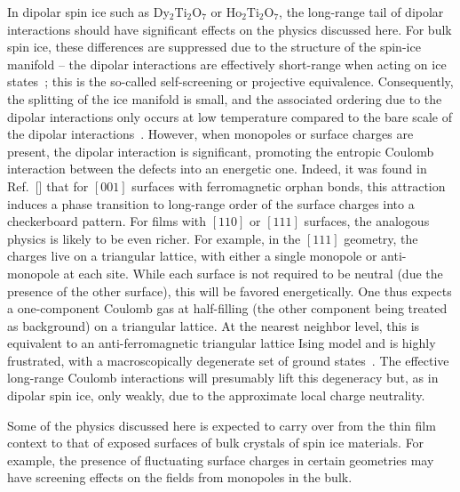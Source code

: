 \documentclass[aps,prx,reprint,runinaddress,superscriptaddress,amsmath,amssymb,floatfix,longbibliography]{revtex4-1}
\newcommand{\abo}[2]{{#1}$_2${#2}$_2$O$_7$}
\begin{document}
In dipolar spin ice such as \abo{Dy}{Ti} or \abo{Ho}{Ti}, the long-range tail of dipolar interactions should have significant effects on the physics discussed here. For bulk spin ice, these differences are suppressed due to the structure of the spin-ice manifold -- the dipolar interactions are effectively short-range when acting on ice states~\cite{Gingras2001CJP,Isakov2005}; this is the so-called self-screening or projective equivalence. Consequently, the splitting of the ice manifold is small, and the associated ordering due to the dipolar interactions only occurs at low temperature compared to the bare scale of the dipolar interactions~\cite{Melko2001}. However, when monopoles or surface charges are present, the dipolar interaction is significant, promoting the entropic Coulomb interaction between the defects into an energetic one. Indeed, it was found in  Ref.~[] that for $[001]$ surfaces with ferromagnetic orphan bonds, this attraction induces a phase transition to long-range order of the surface charges into a checkerboard pattern. For films with $[110]$ or $[111]$ surfaces, the analogous physics is likely to be even richer. For example, in the $[111]$ geometry, the charges live on a triangular lattice, with either a single monopole or anti-monopole at each site. While each surface is not required to be neutral (due the presence of the other surface), this will be favored energetically. One thus expects a one-component Coulomb gas at half-filling (the other component being treated as background) on a triangular lattice. At the nearest neighbor level, this is equivalent to an anti-ferromagnetic triangular lattice Ising model and is highly frustrated, with a macroscopically degenerate set of ground states~\cite{Wannier1950}. The effective long-range Coulomb interactions will presumably lift this degeneracy but, as in dipolar spin ice, only weakly, due to the approximate local charge neutrality. 

Some of the physics discussed here is expected to carry over from the thin film context to that of exposed surfaces of bulk crystals of spin ice materials. For example, the presence of fluctuating surface charges in certain geometries may have screening effects on the fields from monopoles in the bulk. 
 
\end{document}
